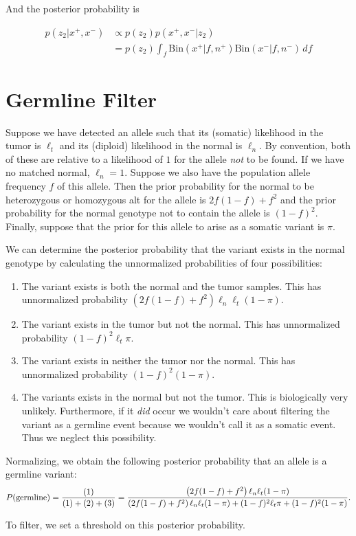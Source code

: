 \documentclass[nofootinbib,amssymb,amsmath]{revtex4}
\begin{document}
And the posterior probability is

\begin{align}
p(z_2 |x^+, x^-) & \propto p(z_2) p(x^+, x^- | z_2) \\
                         & = p(z_2) \int_{f}  \mathrm{Bin}(x^+ | f, n^+) \mathrm{Bin}(x^- | f, n^-) \,df
\end{align}


\section{Germline Filter}\label{germline-filter}
Suppose we have detected an allele such that its (somatic) likelihood in the tumor is $\ell_t$ and its (diploid) likelihood in the normal is $\ell_n$.  By convention, both of these are relative to a likelihood of $1$ for the allele \textit{not} to be found.  If we have no matched normal, $\ell_n = 1$.  Suppose we also have the population allele frequency $f$ of this allele.  Then the prior probability for the normal to be heterozygous or homozygous alt for the allele is $2f(1-f) + f^2$ and the prior probability for the normal genotype not to contain the allele is $(1-f)^2$.  Finally, suppose that the prior for this allele to arise as a somatic variant is $\pi$.

We can determine the posterior probability that the variant exists in the normal genotype by calculating the unnormalized probabilities of four possibilities:
\begin{enumerate}
\item The variant exists is both the normal and the tumor samples.  This has unnormalized probability $\left(2f(1-f) + f^2 \right) \ell_n \ell_t (1 - \pi)$.
\item The variant exists in the tumor but not the normal.  This has unnormalized probability $(1-f)^2 \ell_t \pi$.
\item The variant exists in neither the tumor nor the normal.  This has unnormalized probability $(1-f)^2 (1 - \pi)$.
\item The variants exists in the normal but not the tumor.  This is biologically very unlikely.  Furthermore, if it \textit{did} occur we wouldn't care about filtering the variant as a germline event because we wouldn't call it as a somatic event.  Thus we neglect this possibility.
\end{enumerate}

Normalizing, we obtain the following posterior probability that an allele is a germline variant:
\begin{equation}
P({\rm germline}) = \frac{(1)}{(1) + (2) + (3)} = \frac{\left(2f(1-f) + f^2 \right) \ell_n \ell_t (1 - \pi)}{\left(2f(1-f) + f^2 \right) \ell_n \ell_t (1 - \pi) + (1-f)^2 \ell_t \pi + (1-f)^2 (1 - \pi)}.
\end{equation}

To filter, we set a threshold on this posterior probability.
\end{document}
